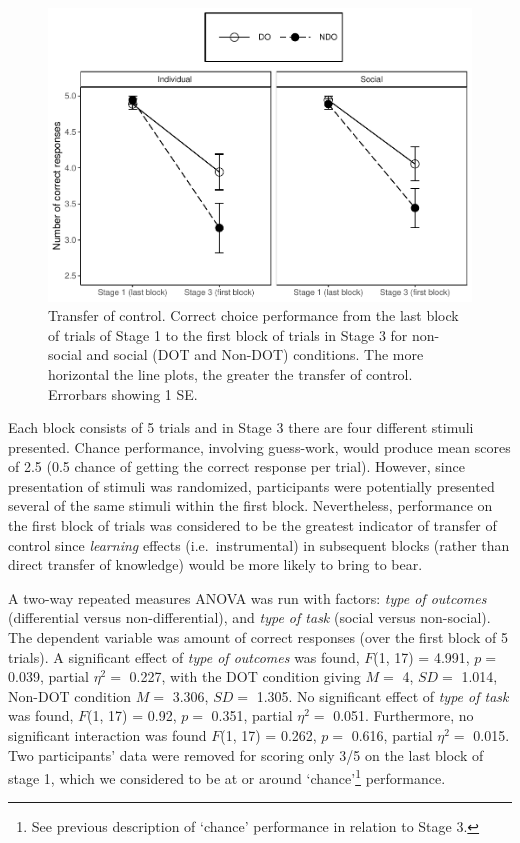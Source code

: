 \documentclass[]{elsarticle} %
\begin{document}
\begin{figure}

{\centering \includegraphics[width=1\linewidth]{Vicarious_value_learning_master_files/figure-latex/figure4-1} 

}

\caption{Transfer of control. Correct choice performance from the last block of trials of Stage 1 to the first block of trials in Stage 3 for non-social and social (DOT and Non-DOT) conditions. The more horizontal the line plots, the greater the transfer of control. Errorbars showing 1 SE.}\label{fig:figure4}
\end{figure}

Each block consists of 5 trials and in Stage 3 there are four different
stimuli presented. Chance performance, involving guess-work, would
produce mean scores of 2.5 (0.5 chance of getting the correct response
per trial). However, since presentation of stimuli was randomized,
participants were potentially presented several of the same stimuli
within the first block. Nevertheless, performance on the first block of
trials was considered to be the greatest indicator of transfer of
control since \emph{learning} effects (i.e.~instrumental) in subsequent
blocks (rather than direct transfer of knowledge) would be more likely
to bring to bear.

A two-way repeated measures ANOVA was run with factors: \emph{type of
outcomes} (differential versus non-differential), and \emph{type of
task} (social versus non-social). The dependent variable was amount of
correct responses (over the first block of 5 trials). A significant
effect of \emph{type of outcomes} was found, \(F\)(1, 17) = 4.991,
\(p=\) 0.039, partial \(\eta^2 =\) 0.227, with the DOT condition giving
\(M =\) 4, \(SD =\) 1.014, Non-DOT condition \(M =\) 3.306, \(SD =\)
1.305. No significant effect of \emph{type of task} was found, \(F\)(1,
17) = 0.92, \(p =\) 0.351, partial \(\eta^2 =\) 0.051. Furthermore, no
significant interaction was found \(F\)(1, 17) = 0.262, \(p =\) 0.616,
partial \(\eta^2 =\) 0.015. Two participants' data were removed for
scoring only 3/5 on the last block of stage 1, which we considered to be
at or around `chance'\footnote{See previous description of `chance'
  performance in relation to Stage 3.} performance.
\end{document}
